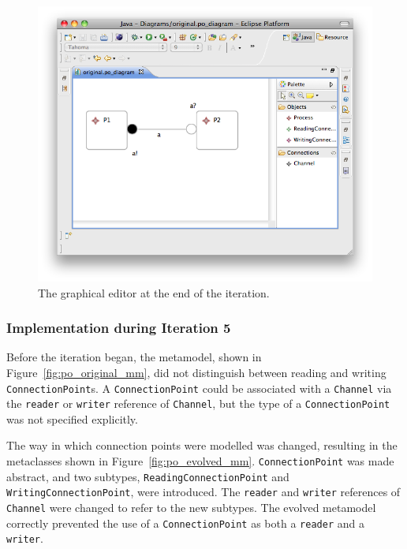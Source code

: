 \begin{figure}[htbp]
	\centering
	\includegraphics[width=13.5cm]{6.Evaluation/images/user_driven/po_evolved_editor.png}
	\caption{The graphical editor at the end of the iteration.}
	\label{fig:po_evolved_editor}
\end{figure}


\subsubsection{Implementation during Iteration 5}
Before the iteration began, the metamodel, shown in Figure~\ref{fig:po_original_mm}, did not distinguish between reading and writing \texttt{Co\-nn\-ec\-ti\-o\-nPo\-i\-nt}s. A \texttt{Co\-nn\-ec\-ti\-o\-nPo\-i\-nt} could be associated with a \texttt{Ch\-an\-nel} via the \texttt{re\-ad\-er} or \texttt{wr\-it\-er} reference of \texttt{Ch\-an\-nel}, but the type of a \texttt{Co\-nn\-ec\-ti\-o\-nPo\-i\-nt} was not specified explicitly.

The way in which connection points were modelled was changed, resulting in the metaclasses shown in Figure~\ref{fig:po_evolved_mm}. \texttt{Co\-nn\-ec\-ti\-o\-nPo\-i\-nt} was made abstract, and two subtypes, \texttt{Re\-ad\-i\-ngCo\-nn\-ec\-ti\-o\-nPo\-i\-nt} and \texttt{Wr\-i\-ti\-ngCo\-nn\-ec\-ti\-o\-nPo\-i\-nt}, were introduced. The \texttt{re\-ad\-er} and \texttt{wr\-it\-er} references of \texttt{Ch\-an\-n\-el} were changed to refer to the new subtypes. The evolved metamodel correctly prevented the use of a \texttt{Co\-nn\-ec\-ti\-o\-nPo\-i\-nt} as both a \texttt{re\-ad\-er} and a \texttt{wr\-it\-er}.

